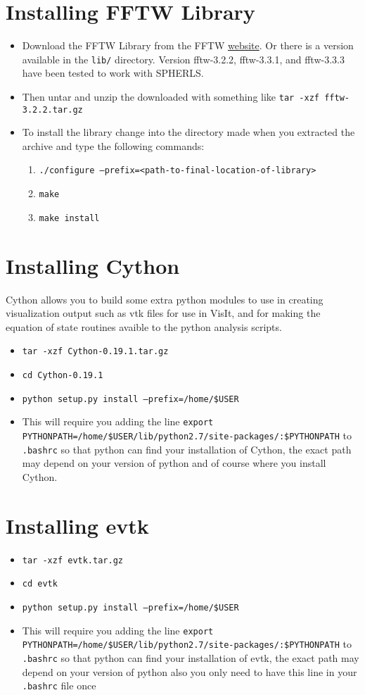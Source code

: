 \documentclass[12pt,a4paper]{book}
\begin{document}
\section{Installing FFTW Library}
\begin{itemize}
\item Download the FFTW Library from the FFTW \href{http://www.fftw.org/download.html}{website}. Or there is a version available in the {\tt lib/} directory. Version fftw-3.2.2, fftw-3.3.1, and fftw-3.3.3 have been tested to work with SPHERLS.
\item Then untar and unzip the downloaded with something like {\tt tar -xzf fftw-3.2.2.tar.gz}
\item To install the library change into the directory made when you extracted the archive and type the following commands:
\begin{enumerate}
\item {\tt ./configure --prefix=<path-to-final-location-of-library>}
\item {\tt make}
\item {\tt make install}
\end{enumerate}
\end{itemize}

\section{Installing Cython}
Cython allows you to build some extra python modules to use in creating visualization output such as vtk files for use in VisIt, and for making the equation of state routines avaible to the python analysis scripts.
\begin{itemize}
\item {\tt tar -xzf Cython-0.19.1.tar.gz}
\item {\tt cd Cython-0.19.1}
\item {\tt  python setup.py install --prefix=/home/\-\$USER}
\item This will require you adding the  line {\tt export PYTHONPATH\-=/home/\-\$USER/\-lib/\-python2.7/\-site-packages/\-:\$PYTHONPATH} to {\tt .bashrc} so that python can find your installation of Cython, the exact path may depend on your version of python and of course where you install Cython.
\end{itemize}

\section{Installing evtk}
\begin{itemize}
\item {\tt tar -xzf evtk.tar.gz}
\item {\tt cd evtk}
\item {\tt  python setup.py install --prefix=/home/\$USER}
\item This will require you adding the line {\tt export PYTHONPATH\-=/home/\-\$USER/\-lib/\-python2.7/\-site-packages/\-:\$PYTHONPATH} to {\tt .bashrc} so that python can find your installation of evtk, the exact path may depend on your version of python also you only need to have this line in your {\tt .bashrc} file once
\end{itemize}
\end{document}
